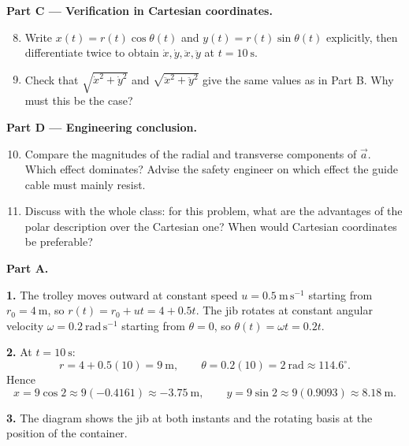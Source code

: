 \documentclass[11pt]{article}
\newcounter{popsec}
\newcounter{popsub}
\newcommand{\courssub}[1]{%
  \stepcounter{popsub}%
  \par\vspace{9pt}\noindent{\popxbold\fontsize{11.5}{13}\selectfont\color{popink}{\color{poporange}\thepopsec.\thepopsub}\hspace{6pt}#1}\par\nopagebreak\vspace{4pt}
}
\begin{document}
\textbf{Part C — Verification in Cartesian coordinates.}

\begin{enumerate}
\setcounter{enumi}{7}
\item Write $x(t) = r(t)\cos\theta(t)$ and $y(t) = r(t)\sin\theta(t)$ explicitly, then differentiate twice to obtain $\dot{x}, \dot{y}, \ddot{x}, \ddot{y}$ at $t = 10\ \mathrm{s}$.
\item Check that $\sqrt{\dot{x}^{2} + \dot{y}^{2}}$ and $\sqrt{\ddot{x}^{2} + \ddot{y}^{2}}$ give the same values as in Part B. Why must this be the case?
\end{enumerate}

\textbf{Part D — Engineering conclusion.}

\begin{enumerate}
\setcounter{enumi}{9}
\item Compare the magnitudes of the radial and transverse components of $\vec{a}$. Which effect dominates? Advise the safety engineer on which effect the guide cable must mainly resist.
\item Discuss with the whole class: for this problem, what are the advantages of the polar description over the Cartesian one? When would Cartesian coordinates be preferable?
\end{enumerate}

\courssub{Model answer}

\textbf{Part A.}

\textbf{1.} The trolley moves outward at constant speed $u = 0.5\ \mathrm{m\,s^{-1}}$ starting from $r_0 = 4\ \mathrm{m}$, so $r(t) = r_0 + ut = 4 + 0.5t$. The jib rotates at constant angular velocity $\omega = 0.2\ \mathrm{rad\,s^{-1}}$ starting from $\theta = 0$, so $\theta(t) = \omega t = 0.2t$.

\textbf{2.} At $t = 10\ \mathrm{s}$:
\[ r = 4 + 0.5(10) = 9\ \mathrm{m}, \qquad \theta = 0.2(10) = 2\ \mathrm{rad} \approx 114.6^{\circ}. \]
Hence
\[ x = 9\cos 2 \approx 9(-0.4161) \approx -3.75\ \mathrm{m}, \qquad y = 9\sin 2 \approx 9(0.9093) \approx 8.18\ \mathrm{m}. \]

\textbf{3.} The diagram shows the jib at both instants and the rotating basis at the position of the container.
\end{document}
